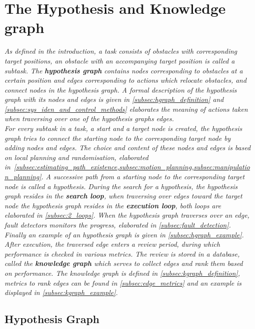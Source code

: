 \chapter{The Hypothesis and Knowledge graph}
\textit{
As defined in the introduction, a task consists of obstacles with corresponding target positions, an obstacle with an accompanying target position is called a subtask. The \textbf{hypothesis graph} contains nodes corresponding to obstacles at a certain position and edges corresponding to actions which relocate obstacles, and connect nodes in the hypothesis graph. A formal description of the hypothesis graph with its nodes and edges is given in \cref{subsec:hgraph_definition} and \cref{subsec:sys_iden_and_control_methods} elaborates the meaning of actions taken when traversing over one of the hypothesis graphs edges.\\
\newline
For every subtask in a task, a start and a target node is created, the hypothesis graph tries to connect the starting node to the corresponding target node by adding nodes and edges. The choice and content of these nodes and edges is based on local planning and randomisation, elaborated in~\cref{subsec:estimating_path_existence,subsec:motion_planning,subsec:manipulation_planning}. A successive path from a starting node to the corresponding target node is called a hypothesis. During the search for a hypothesis, the hypothesis graph resides in the \textbf{search loop}, when traversing over edges toward the target node the hypothesis graph resides in the \textbf{execution loop}, both loops are elaborated in \cref{subsec:2_loops}. When the hypothesis graph traverses over an edge, fault detectors monitors the progress, elaborated in \cref{subsec:fault_detection}. Finally an example of an hypothesis graph is given in \cref{subsec:hgraph_example}.\\
\newline
After execution, the traversed edge enters a review period, during which performance is checked in various metrics. The review is stored in a database, called the \textbf{knowledge graph} which serves to collect edges and rank them based on performance. The knowledge graph is defined in \cref{subsec:kgraph_definition}, metrics to rank edges can be found in \cref{subsec:edge_metrics} and an example is displayed in \cref{subsec:kgraph_example}.
}

\newpage

\section{Hypothesis Graph}
\label{sec:hgraph}

